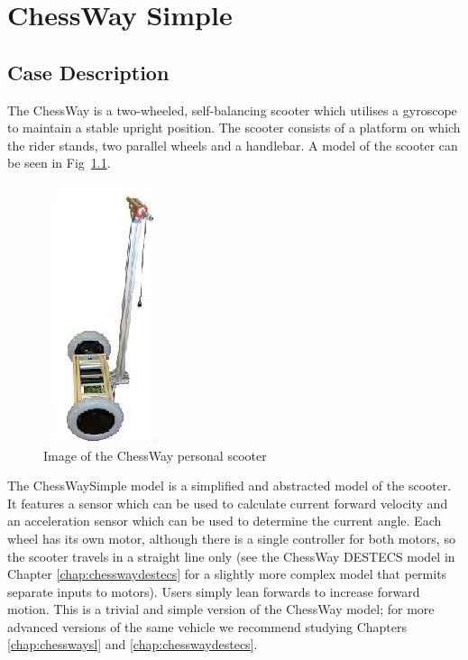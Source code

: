 \chapter{ChessWay Simple} \label{chap:chesswaysimple}
\section{Case Description} The ChessWay is a two-wheeled,
self-balancing scooter which utilises a gyroscope to maintain a stable
upright position. The scooter consists of a platform on which the
rider stands, two parallel wheels and a handlebar.  A model of the
scooter can be seen in Fig~\ref{fig:chessWaySimple}.

\begin{figure}[!ht] \centering
\includegraphics{chessWaySimple/chesswaySimple.JPG}
\caption{Image of the ChessWay personal scooter
\label{fig:chessWaySimple}} \end{figure}

The ChessWaySimple model is a simplified and abstracted model of the
scooter.  It features a sensor which can be used to calculate current
forward velocity and an acceleration sensor which can be used to
determine the current angle. Each wheel has its own motor, although
there is a single controller for both motors, so the scooter travels
in a straight line only (see the ChessWay DESTECS model in Chapter
\ref{chap:chesswaydestecs} for a slightly more complex model that
permits separate inputs to motors). Users simply lean forwards to
increase forward motion.  This is a trivial and simple version of the
ChessWay model; for more advanced versions of the same vehicle we
recommend studying Chapters \ref{chap:chesswaysl} and
\ref{chap:chesswaydestecs}.


